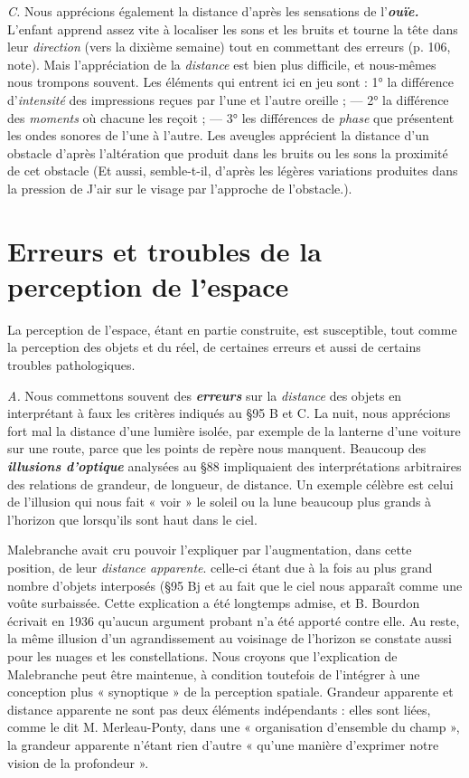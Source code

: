{\it C.} Nous apprécions également la distance d’après les sensations de
l’\textbf{\textit {ouïe.}} L'enfant apprend assez vite à localiser les sons et les bruits et
tourne la tête dans leur {\it direction} (vers la dixième semaine) tout en
commettant des erreurs (p. 106, note). Mais l’appréciation de la {\it distance}
est bien plus difficile, et nous-mêmes nous trompons souvent.
Les éléments qui entrent ici en jeu sont : 1° la différence d’{\it intensité}
des impressions reçues par l’une et l’autre oreille ; — 2° la différence
des {\it moments} où chacune les reçoit ; — 3° les différences de {\it phase} que
présentent les ondes sonores de l’une à l’autre. Les aveugles apprécient
la distance d’un obstacle d’après l’altération que produit dans
les bruits ou les sons la proximité de cet obstacle {\scriptsize (Et aussi, semble-t-il, d’après les légères variations produites dans la pression de
J'air sur le visage par l'approche de l'obstacle.)}.

\section{Erreurs et troubles de la perception de l’espace}%
La
perception de l’espace, étant en partie construite, est susceptible,
tout comme la perception des objets et du réel, de certaines erreurs
et aussi de certains troubles pathologiques.

{\it A.} Nous commettons souvent des \textbf{\textit {erreurs}} sur la {\it distance} des objets
en interprétant à faux les critères indiqués au \S 95 B et C. La nuit,
nous apprécions fort mal la distance d’une lumière isolée, par exemple
de la lanterne d’une voiture sur une route, parce que les points de
repère nous manquent. Beaucoup des \textbf{\textit {illusions d'optique}} analysées
au \S 88 impliquaient des interprétations arbitraires des relations de
grandeur, de longueur, de distance. Un exemple célèbre est celui de
l'illusion qui nous fait « voir » le soleil ou la lune beaucoup plus
grands à l'horizon que lorsqu'ils sont haut dans le ciel.

\vspace{0.24cm}
{\footnotesize Malebranche avait cru pouvoir l'expliquer par l'augmentation, dans
cette position, de leur {\it distance apparente}. celle-ci étant due à la fois au plus
grand nombre d'objets interposés (\S 95 Bj et au fait que le ciel nous
apparaît comme une voûte surbaissée. Cette explication a été longtemps
admise, et B. Bourdon écrivait en 1936 qu’aucun argument probant n'a
été apporté contre elle. Au reste, la même illusion d’un agrandissement au
voisinage de l'horizon se constate aussi pour les nuages et les constellations.
Nous croyons que l’explication de Malebranche peut être maintenue, à
condition toutefois de l'intégrer à une conception plus « synoptique » de la
perception spatiale. Grandeur apparente et distance apparente ne sont pas
deux éléments indépendants : elles sont liées, comme le dit M. Merleau-Ponty,
dans une « organisation d'ensemble du champ », la grandeur apparente
n'étant rien d'autre « qu’une manière d'exprimer notre vision de la
profondeur ».}
\vspace{0.31cm}


